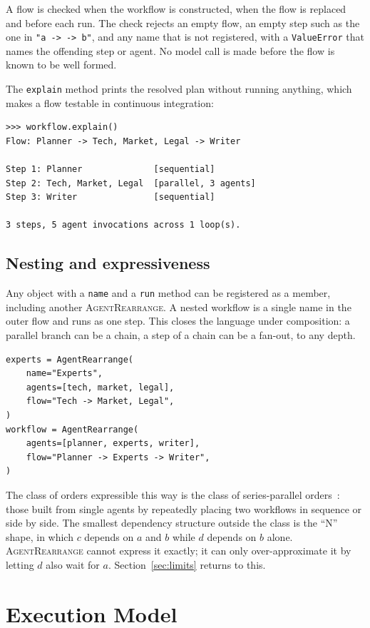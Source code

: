 \documentclass[11pt]{article}
\newcommand{\code}[1]{\texttt{#1}}
\newcommand{\AR}{\textsc{AgentRearrange}}
\begin{document}
A flow is checked when the workflow is constructed, when the flow is replaced and before each run. The check rejects an empty flow, an empty step such as the one in \code{"a -> -> b"}, and any name that is not registered, with a \code{ValueError} that names the offending step or agent. No model call is made before the flow is known to be well formed.

The \code{explain} method prints the resolved plan without running anything, which makes a flow testable in continuous integration:

\begin{lstlisting}[style=plain]
>>> workflow.explain()
Flow: Planner -> Tech, Market, Legal -> Writer

Step 1: Planner              [sequential]
Step 2: Tech, Market, Legal  [parallel, 3 agents]
Step 3: Writer               [sequential]

3 steps, 5 agent invocations across 1 loop(s).
\end{lstlisting}

\subsection{Nesting and expressiveness}

Any object with a \code{name} and a \code{run} method can be registered as a member, including another \AR{}. A nested workflow is a single name in the outer flow and runs as one step. This closes the language under composition: a parallel branch can be a chain, a step of a chain can be a fan-out, to any depth.

\begin{lstlisting}
experts = AgentRearrange(
    name="Experts",
    agents=[tech, market, legal],
    flow="Tech -> Market, Legal",
)
workflow = AgentRearrange(
    agents=[planner, experts, writer],
    flow="Planner -> Experts -> Writer",
)
\end{lstlisting}

The class of orders expressible this way is the class of series-parallel orders~\cite{sp_graphs}: those built from single agents by repeatedly placing two workflows in sequence or side by side. The smallest dependency structure outside the class is the ``N'' shape, in which $c$ depends on $a$ and $b$ while $d$ depends on $b$ alone. \AR{} cannot express it exactly; it can only over-approximate it by letting $d$ also wait for $a$. Section~\ref{sec:limits} returns to this.

\section{Execution Model}
\label{sec:execution}
\end{document}
